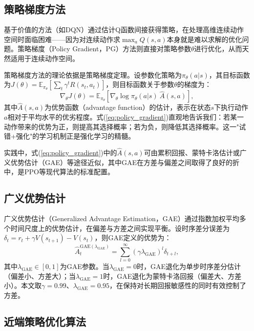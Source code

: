 \documentclass[12pt,a4paper,UTF8]{ctexbook}
\begin{document}
\subsection{策略梯度方法}

基于价值的方法（如DQN\cite{ref40}）通过估计Q函数间接获得策略，在处理高维连续动作空间时面临困难——因为对连续动作求$\max_a Q(s,a)$本身就是难以求解的优化问题。策略梯度（Policy Gradient，PG）方法则直接对策略参数$\theta$进行优化，从而天然适用于连续动作空间。

策略梯度方法的理论依据是策略梯度定理。设参数化策略为$\pi_\theta(a|s)$，其目标函数为$J(\theta)=\mathbb{E}_{\pi_\theta}\left[\sum_t\gamma^t R(s_t,a_t)\right]$，则目标函数关于参数$\theta$的梯度为：
\begin{equation}
    \nabla_\theta J(\theta) = \mathbb{E}_{\pi_\theta}\left[\nabla_\theta\log\pi_\theta(a|s)\ \hat{A}(s,a)\right],
    \label{eq:policy_gradient}
\end{equation}
其中$\hat{A}(s,a)$为优势函数（advantage function）的估计，表示在状态$s$下执行动作$a$相对于平均水平的优劣程度。式(\ref{eq:policy_gradient})直观地告诉我们：若某一动作带来的优势为正，则提高其选择概率；若为负，则降低其选择概率。这一"试错+强化"的学习机制正是强化学习的精髓。

实践中，式(\ref{eq:policy_gradient})中的$\hat{A}(s,a)$可由累积回报、蒙特卡洛估计或广义优势估计（GAE）等途径近似，其中GAE在方差与偏差之间取得了良好的折中，是PPO等现代算法的标准配置。

\subsection{广义优势估计}

广义优势估计（Generalized Advantage Estimation，GAE）\cite{ref38}通过指数加权平均多个时间尺度上的优势估计，在偏差与方差之间实现平衡。设时序差分误差为$\delta_t = r_t + \gamma V(s_{t+1}) - V(s_t)$，则GAE定义的优势为：
\begin{equation}
    \hat{A}_t^{\text{GAE}(\lambda_{\text{GAE}})} = \sum_{l=0}^{\infty}(\gamma\lambda_{\text{GAE}})^l \delta_{t+l},
    \label{eq:gae}
\end{equation}
其中$\lambda_{\text{GAE}}\in[0,1]$为GAE参数。当$\lambda_{\text{GAE}}=0$时，GAE退化为单步时序差分估计（偏差小、方差大）；当$\lambda_{\text{GAE}}=1$时，GAE退化为蒙特卡洛回报（偏差大、方差小）。本文取$\gamma=0.99$、$\lambda_{\text{GAE}}=0.95$，在保持对长期回报敏感性的同时有效控制了方差。

\subsection{近端策略优化算法}
\end{document}
